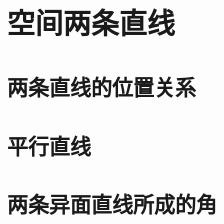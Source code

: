 \section{空间两条直线}
\subsection{两条直线的位置关系}
\begin{Practice}
  \begin{question}
    \item 
    \item 
    \item 
  \end{question}
\end{Practice}
\subsection{平行直线}
\begin{Practice}
  \begin{question}
    \item 
    \item 
  \end{question}
\end{Practice}
\subsection{两条异面直线所成的角}
\begin{Practice}
  \begin{question}
    \item 
    \item 
    \item 
  \end{question}
\end{Practice}
\begin{Exercise}
  \begin{question}
    \item 
    \item 
    \item 
    \item 
    \item 
    \item 
    \item 
    \item 
    \item 
    \item 
    \item 
  \end{question}
\end{Exercise}

